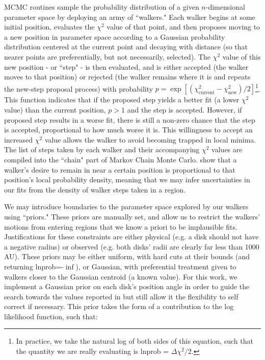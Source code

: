 MCMC routines sample the probability distribution of a given $n$-dimensional parameter space by deploying an army of ``walkers." Each walker begins at some initial position, evaluates the $\chi^2$ value of that point, and then proposes moving to a new position in parameter space according to a Gaussian probability distribution centered at the current point and decaying with distance (so that nearer points are preferentially, but not necessarily, selected). The $\chi^2$ value of this new position - or ``step" - is then evaluated, and is either accepted (the walker moves to that position) or rejected (the walker remains where it is and repeats the new-step proposal process) with probability $p = \exp \left[ (\chi_\text{current}^2 - \chi_\text{new}^2)/2 \right]$\footnote{In practice, we take the natural log of both sides of this equation, such that the quantity we are really evaluating is lnprob = $\Delta \chi^2/2$.}. This function indicates that if the proposed step yields a better fit (a lower $\chi^2$ value) than the current position, $p > 1$ and the step is accepted. However, if proposed step results in a worse fit, there is still a non-zero chance that the step is accepted, proportional to how much worse it is. This willingness to accept an increased $\chi^2$ value allows the walker to avoid becoming trapped in local minima. The list of steps taken by each walker and their accompanying $\chi^2$ values are compiled into the ``chain" part of Markov Chain Monte Carlo. \citet{Goodman2010} show that a walker's desire to remain in near a certain position is proportional to that position's local probability density, meaning that we may infer uncertainties in our fits from the density of walker steps taken in a region.

We may introduce boundaries to the parameter space explored by our walkers using ``priors." These priors are manually set, and allow us to restrict the walkers' motions from entering regions that we know a priori to be implausible fits. Justifications for these constraints are either physical (e.g. a disk should not have a negative radius) or observed (e.g. both disks' radii are clearly far less than 1000 AU). These priors may be either uniform, with hard cuts at their bounds (and returning lnprob=-$\inf$), or Gaussian, with preferential treatment given to walkers closer to the Gaussian centroid (a known value). For this work, we implement a Gaussian prior on each disk's position angle in order to guide the search towards the values reported in \citet{Williams2014} but still allow it the flexibility to self correct if necessary. This prior takes the form of a contribution to the log likelihood function, such that:

